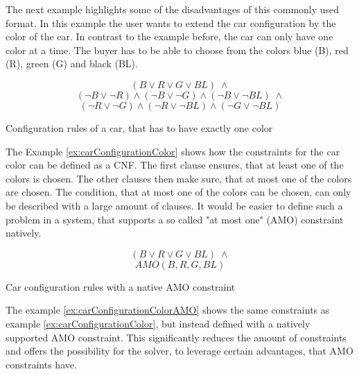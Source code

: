 The next example highlights some of the disadvantages of this commonly used format. In this example the user wants to extend the car configuration by the color of the car. In contrast to the example before, the car can only have one color at a time. The buyer has to be able to choose from the colors blue (B), red (R), green (G) and black (BL).
\begin{example}
\begin{leftbar}
\begin{displaymath}
(B \vee R \vee G \vee BL) \; \wedge
\end{displaymath}
\begin{displaymath}
(\neg B \vee \neg R) \wedge (\neg B \vee \neg G) \wedge (\neg B \vee \neg BL)\; \wedge
\end{displaymath}
\begin{displaymath}
(\neg R \vee \neg G) \wedge (\neg R \vee \neg BL) \wedge (\neg G \vee \neg BL)
\end{displaymath}
\end{leftbar}
\caption{Configuration rules of a car, that has to have exactly one color}
\label{ex:carConfigurationColor}
\end{example}

The Example \ref{ex:carConfigurationColor} shows how the constraints for the car color can be defined as a CNF. The first clause ensures, that at least one of the colors is chosen. The other clauses then make sure, that at most one of the colors are chosen. The condition, that at most one of the colors can be chosen, can only be described with a large amount of clauses. It would be easier to define such a problem in a system, that supports a so called "at most one" (AMO) constraint natively.

\begin{example}
\begin{leftbar}
\begin{displaymath}
(B \vee R \vee G \vee BL) \; \wedge
\end{displaymath}
\begin{displaymath}
AMO(B,R,G,BL)
\end{displaymath}
\end{leftbar}
\caption{Car configuration rules with a native AMO constraint}
\label{ex:carConfigurationColorAMO}
\end{example}

The example \ref{ex:carConfigurationColorAMO} shows the same constraints as example \ref{ex:carConfigurationColor}, but instead defined with a natively supported AMO constraint. This significantly reduces the amount of constraints and offers the possibility for the solver, to leverage certain advantages, that AMO constraints have.

